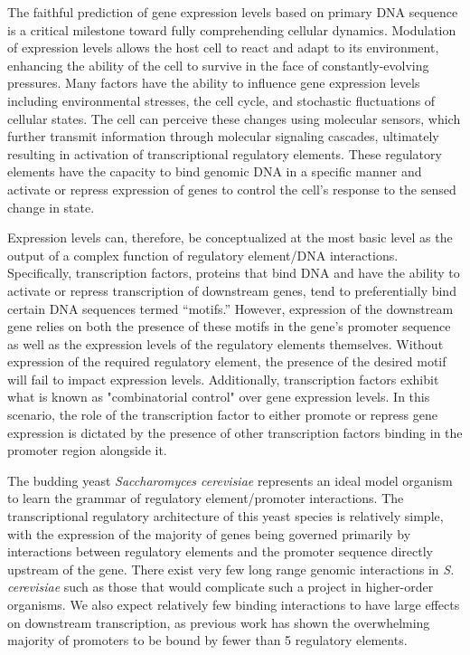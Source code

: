 \documentclass{article}
\begin{document}
The faithful prediction of gene expression levels based on primary DNA sequence is a critical milestone toward fully comprehending cellular dynamics. Modulation of expression levels allows the host cell to react and adapt to its environment, enhancing the ability of the cell to survive in the face of constantly-evolving pressures. Many factors have the ability to influence gene expression levels including environmental stresses, the cell cycle, and stochastic fluctuations of cellular states. The cell can perceive these changes using molecular sensors, which further transmit information through molecular signaling cascades, ultimately resulting in activation of transcriptional regulatory elements. These regulatory elements have the capacity to bind genomic DNA in a specific manner and activate or repress expression of genes to control the cell's response to the sensed change in state.

Expression levels can, therefore, be conceptualized at the most basic level as the output of a complex function of regulatory element/DNA interactions. Specifically, transcription factors, proteins that bind DNA and have the ability to activate or repress transcription of downstream genes, tend to preferentially bind certain DNA sequences termed “motifs.” However, expression of the downstream gene relies on both the presence of these motifs in the gene’s promoter sequence as well as the expression levels of the regulatory elements themselves. Without expression of the required regulatory element, the presence of the desired motif will fail to impact expression levels. Additionally, transcription factors exhibit what is known as "combinatorial control" over gene expression levels. In this scenario, the role of the transcription factor to either promote or repress gene expression is dictated by the presence of other transcription factors binding in the promoter region alongside it.

The budding yeast \textit{Saccharomyces cerevisiae} represents an ideal model organism to learn the grammar of regulatory element/promoter interactions. The transcriptional regulatory architecture of this yeast species is relatively simple, with the expression of the majority of genes being governed primarily by interactions between regulatory elements and the promoter sequence directly upstream of the gene. There exist very few long range genomic interactions in \textit{S. cerevisiae} such as those that would complicate such a project in higher-order organisms. We also expect relatively few binding interactions to have large effects on downstream transcription, as previous work has shown the overwhelming majority of promoters to be bound by fewer than 5 regulatory elements.
\end{document}
